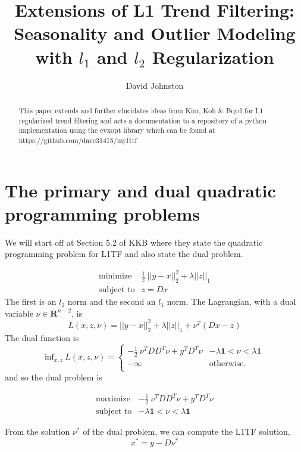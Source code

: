 \documentclass{article}
\begin{document}
\title{Extensions of L1 Trend Filtering: Seasonality and Outlier Modeling
with $l_1$ and $l_2$ Regularization}
\author{David Johnston}

\maketitle

\begin{abstract}
This paper extends and further elucidates ideas from Kim, Koh \& Boyd for L1 regularized
trend filtering and acts a documentation to a repository of a python
implementation using the cvxopt library which can be found at https://github.com/dave31415/myl1tf
\end{abstract}

\section{The primary and dual quadratic programming problems}

We will start off at Section 5.2 of KKB where they state the quadratic programming problem for L1TF
and also state the dual problem.

\begin{eqnarray}
\mbox{minimize} & \frac{1}{2} ~ || y - x ||_2^2  + \lambda ||z||_1 \\
\mbox{subject to} & z = D x
\end{eqnarray}
The first is an $l_2$ norm and the second an $l_1$ norm. The Lagrangian, with a dual variable $\nu \in \mathbf{R}^{n-2}$, is
\[
L(x,z,\nu) =  || y - x ||_2^2  + \lambda ||z||_1 + \nu^T (D x -z)
\]
The dual function is
\[
\mbox{inf}_{x,z} ~ L(x,z,\nu) =
    \left\{
    \begin{array}{ll}
    - \frac{1}{2} ~ \nu^T D D^T \nu + y^T D^T \nu &  - \lambda \mathbf{1} < \nu < \lambda \mathbf{1} \\
  -\infty  & \mbox{otherwise.} \\
  \end{array}
  \right.
\]
and so the dual problem is

\begin{eqnarray}
\mbox{maximize} & -\frac{1}{2} ~ \nu^T D D^T \nu + y^T D^T \nu \\
\mbox{subject to} & - \lambda \mathbf{1} < \nu < \lambda \mathbf{1}
\end{eqnarray}

From the solution $\nu^*$ of the dual problem, we can compute the L1TF solution,
\[
x^* = y - D \nu^*
\]
\end{document}
